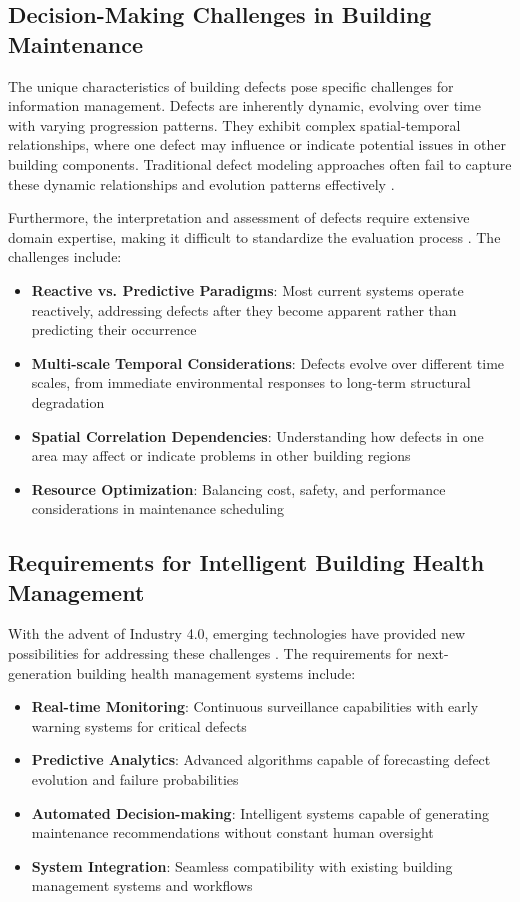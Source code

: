 \subsection{Decision-Making Challenges in Building Maintenance}

The unique characteristics of building defects pose specific challenges for information management. Defects are inherently dynamic, evolving over time with varying progression patterns. They exhibit complex spatial-temporal relationships, where one defect may influence or indicate potential issues in other building components. Traditional defect modeling approaches often fail to capture these dynamic relationships and evolution patterns effectively \cite{wang2023augmented}.

Furthermore, the interpretation and assessment of defects require extensive domain expertise, making it difficult to standardize the evaluation process \cite{hamdan2021semantic}. The challenges include:

\begin{itemize}
    \item \textbf{Reactive vs. Predictive Paradigms}: Most current systems operate reactively, addressing defects after they become apparent rather than predicting their occurrence
    \item \textbf{Multi-scale Temporal Considerations}: Defects evolve over different time scales, from immediate environmental responses to long-term structural degradation
    \item \textbf{Spatial Correlation Dependencies}: Understanding how defects in one area may affect or indicate problems in other building regions
    \item \textbf{Resource Optimization}: Balancing cost, safety, and performance considerations in maintenance scheduling
\end{itemize}

\subsection{Requirements for Intelligent Building Health Management}

With the advent of Industry 4.0, emerging technologies have provided new possibilities for addressing these challenges \cite{zhang2022integrating,chen2021geo}. The requirements for next-generation building health management systems include:

\begin{itemize}
    \item \textbf{Real-time Monitoring}: Continuous surveillance capabilities with early warning systems for critical defects
    \item \textbf{Predictive Analytics}: Advanced algorithms capable of forecasting defect evolution and failure probabilities
    \item \textbf{Automated Decision-making}: Intelligent systems capable of generating maintenance recommendations without constant human oversight
    \item \textbf{System Integration}: Seamless compatibility with existing building management systems and workflows
\end{itemize}

